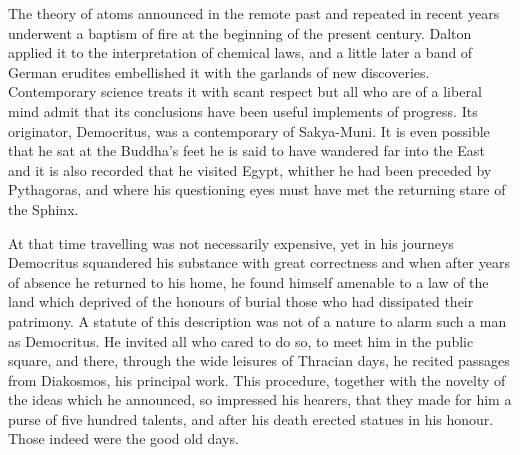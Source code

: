 \documentclass[]{book}
\begin{document}
The theory of atoms announced in the remote past and repeated in recent
years underwent a baptism of fire at the beginning of the present
century. Dalton applied it to the interpretation of chemical laws, and a
little later a band of German erudites embellished it with the garlands
of new discoveries. Contemporary science treats it with scant respect
but all who are of a liberal mind admit that its conclusions have been
useful implements of progress. Its originator, Democritus, was a
contemporary of Sakya-Muni. It is even possible that he sat at the
Buddha's feet he is said to have wandered far into the East and it is
also recorded that he visited Egypt, whither he had been preceded by
Pythagoras, and where his questioning eyes must have met the returning
stare of the Sphinx.

At that time travelling was not necessarily expensive, yet in his
journeys Democritus squandered his substance with great correctness and
when after years of absence he returned to his home, he found himself
amenable to a law of the land which deprived of the honours of burial
those who had dissipated their patrimony. A statute of this description
was not of a nature to alarm such a man as Democritus. He invited all
who cared to do so, to meet him in the public square, and there, through
the wide leisures of Thracian days, he recited passages from Diakosmos,
his principal work. This procedure, together with the novelty of the
ideas which he announced, so impressed his hearers, that they made for
him a purse of five hundred talents, and after his death erected statues
in his honour. Those indeed were the good old days.
\end{document}
